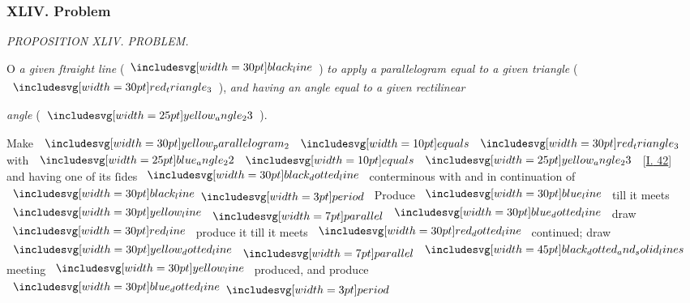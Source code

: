 \documentclass[11pt,preview]{standalone}
\begin{document}
\subsubsection{XLIV. Problem}

\begin{minipage}[t]{0.55\textwidth}
    \begin{center}
        \textit{PROPOSITION XLIV. PROBLEM.}\label{book1pr44} \\
    \end{center}

    \hfill

    \begin{center}
        \raggedright \lettrine[lines=3, loversize=1, nindent=0pt]{}{}O \textit{a given ſtraight line} (\hspace{-1ex}$\blackline$\hspace{-1ex}) \textit{to apply a parallelogram equal to a given triangle} (\hspace{-1ex}$\img[0][0][30]{red_triangle_3}$\hspace{-1ex}), \textit{and having an angle equal to a given rectilinear}
    \end{center}
    \textit{angle} (\hspace{-1ex}$\img{yellow_angle_23}$\hspace{-1ex}).
\end{minipage}%
\hfill
\begin{minipage}[t]{0.43\textwidth}
    \vspace{20pt}
    
\end{minipage}

\hfill

{\vspace{1ex}\begin{center}
        Make $\img[0][0][30]{yellow_parallelogram_2} \bequals \img[0][0][30]{red_triangle_3}$ with $\img{blue_angle_22} \bequals \img{yellow_angle_23}$ [\hyperref[book1pr42]{\textsc{I.} 42}]\\
        and having one of its ſides $\dottedblackline$ conterminous with and in continuation of $\blackline \bperiod$ Produce $\blueline$ till it meets $\yellowline \bparallel \dottedblueline$ draw $\redline$ produce it till it meets $\dottedredline$ continued; draw $\dottedyellowline \bparallel \bimg{black_dotted_and_solid_lines}$ meeting $\yellowline$ produced, and produce $\dottedblueline \bperiod$
    \end{center}}
\end{document}
